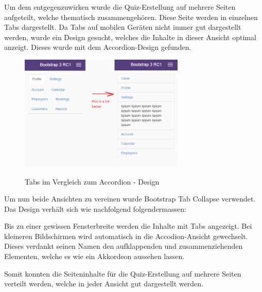 Um dem entgegenzuwirken wurde die Quiz-Erstellung auf mehrere Seiten aufgeteilt, welche thematisch zusammengehören. Diese Seite werden in einzelnen Tabs dargestellt. Da Tabs auf mobilen Geräten nicht immer gut dargestellt werden, wurde ein Design gesucht, welches die Inhalte in dieser Ansicht optimal anzeigt. Dieses wurde mit dem Accordion-Design gefunden.


\begin{figure}[H]
	\centering
	\includegraphics[width=0.7\textwidth]{Images/Bootstrap_Accordion.png}
	\caption{Tabs im Vergleich zum Accordion - Design}
	\cite{tabs_accodion}
\end{figure}

Um nun beide Ansichten zu vereinen wurde \glqq Bootstrap Tab Collapse\grqq \cite{bootstrap-tabcollapse} verwendet. Das Design verhält sich wie nachfolgend folgendermassen:

Bis zu einer gewissen Fensterbreite werden die Inhalte mit Tabs angezeigt. Bei kleineren Bildschirmen wird automatisch in die Accodion-Ansicht gewechselt. Dieses verdankt seinen Namen den aufklappenden und zusammenziehenden Elementen, welche es wie ein Akkordeon aussehen lassen.

Somit konnten die Seiteninhalte für die Quiz-Erstellung auf mehrere Seiten verteilt werden, welche in jeder Ansicht gut dargestellt werden.


